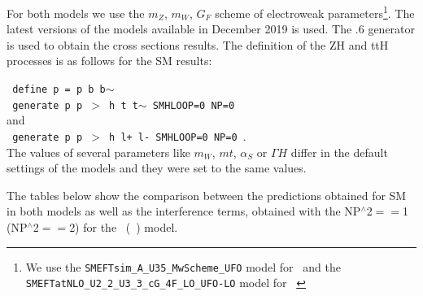 For both models we use the $m_Z$, $m_W$, $G_F$ scheme of electroweak parameters\footnote{We use the \texttt{SMEFTsim\_A\_U35\_MwScheme\_UFO} model for \SMEFTsim\ and the \texttt{SMEFTatNLO\_U2\_2\_U3\_3\_cG\_4F\_LO\_UFO-LO} model for \SMEFTatNLO\ }. The latest versions of the models available in December 2019 is used.  The .6 generator is used to obtain the cross sections results. The definition of the ZH and ttH processes is as follows for the SM results:

\noindent
  \texttt{ define p = p b b$\sim$ }\\
  \texttt{ generate p p $>$ h t t$\sim$ SMHLOOP=0 NP=0 }\\
and \\ 
  \texttt{ generate p p $>$ h l+ l- SMHLOOP=0  NP=0     }.\\
  
  The values of several parameters like $m_W$, $mt$, $\alpha_S$ or $\Gamma H$ differ in the default settings of the models and they were set to the same values.

  The tables below show the comparison between the predictions obtained for SM in both models as well as the interference terms, obtained with the NP$^{\wedge}$2$==$1 (NP$^{\wedge}$2$==$2)  for the \SMEFTsim\ (\SMEFTatNLO\ ) model.

